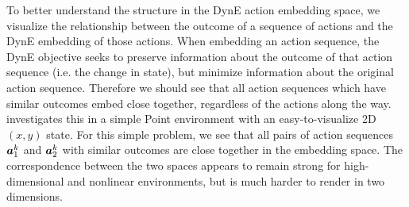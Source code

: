 \label{sec:latent-vis}


To better understand the structure in the DynE action embedding space, we visualize the relationship between the outcome of a sequence of actions and the DynE embedding of those actions.
When embedding an action sequence, the DynE objective seeks to preserve information about the outcome of that action sequence (i.e. the change in state), but minimize information about the original action sequence.
Therefore we should see that all action sequences which have similar outcomes embed close together, regardless of the actions along the way.
 investigates this in a simple Point environment with an easy-to-visualize 2D $(x, y)$ state.
For this simple problem, we see that all pairs of action sequences ${\bm{a}}^k_1$ and ${\bm{a}}^k_2$ with similar outcomes are close together in the embedding space.
The correspondence between the two spaces appears to remain strong for high-dimensional and nonlinear environments, but is much harder to render in two dimensions.

